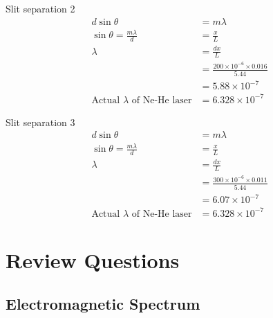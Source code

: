\documentclass{report}
\begin{document}
			Slit separation 2
			\begin{align*}
				d \sin{\theta} &= m \lambda \\
				\sin{\theta} = \frac{m \lambda}{d} &= \frac{x}{L} \\
				\lambda &= \frac{dx}{L} \\
					&= \frac{200 \times 10^{-6} \times 0.016}{5.44} \\
					&= 5.88 \times 10^{-7} \\
			\text{Actual $\lambda$ of Ne-He laser} &= 6.328 \times 10^{-7}
			\end{align*}

			Slit separation 3
			\begin{align*}
				d \sin{\theta} &= m \lambda \\
				\sin{\theta} = \frac{m \lambda}{d} &= \frac{x}{L} \\
				\lambda &= \frac{dx}{L} \\
					&= \frac{300 \times 10^{-6} \times 0.011}{5.44} \\
					&= 6.07 \times 10^{-7} \\
			\text{Actual $\lambda$ of Ne-He laser} &= 6.328 \times 10^{-7}
			\end{align*}
\newpage

\chapter{Review Questions}

	\section{Electromagnetic Spectrum}
\end{document}

